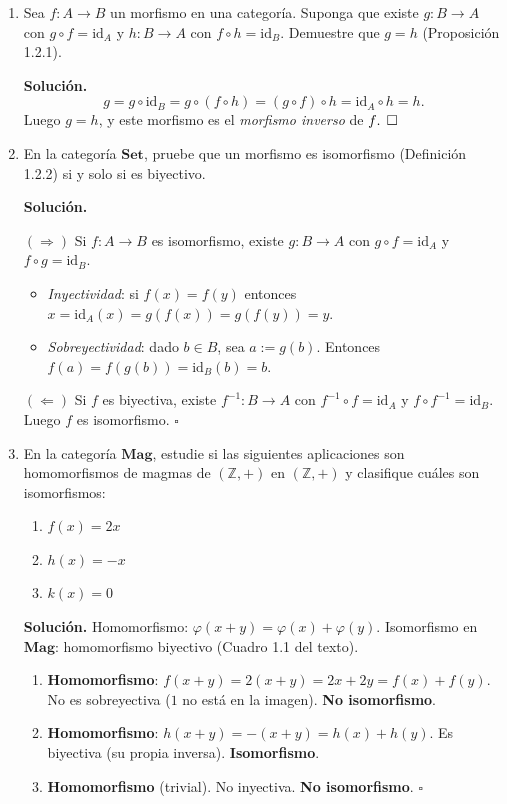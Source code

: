 \begin{enumerate}[label=\textbf{3.\arabic*.}]
\item Sea \(f:A\to B\) un morfismo en una categoría. Suponga que existe
\(g:B\to A\) con \(g\circ f=\mathrm{id}_A\) y \(h:B\to A\) con
\(f\circ h=\mathrm{id}_B\). Demuestre que \(g=h\) (Proposición 1.2.1).

\textbf{Solución.}
\[
    g = g\circ\mathrm{id}_B = g\circ(f\circ h) = (g\circ f)\circ h
      = \mathrm{id}_A\circ h = h.
\]
Luego \(g=h\), y este morfismo es el \textit{morfismo inverso} de \(f$.
\hfill\(\square\)

\item En la categoría \(\mathbf{Set}\), pruebe que un morfismo es isomorfismo
(Definición 1.2.2) si y solo si es biyectivo.

\textbf{Solución.}

\((\Rightarrow)\) Si \(f:A\to B\) es isomorfismo, existe \(g:B\to A\) con
\(g\circ f=\mathrm{id}_A\) y \(f\circ g=\mathrm{id}_B\).
\begin{itemize}
    \item \textit{Inyectividad}: si \(f(x)=f(y)\) entonces
    \(x = \mathrm{id}_A(x)=g(f(x))=g(f(y))=y\).
    \item \textit{Sobreyectividad}: dado \(b\in B\), sea \(a:=g(b)\).
    Entonces \(f(a)=f(g(b))=\mathrm{id}_B(b)=b\).
\end{itemize}

\((\Leftarrow)\) Si \(f\) es biyectiva, existe \(f^{-1}:B\to A\) con
\(f^{-1}\circ f=\mathrm{id}_A\) y \(f\circ f^{-1}=\mathrm{id}_B\).
Luego \(f\) es isomorfismo. \hfill\(\square\)

\item En la categoría \(\mathbf{Mag}\), estudie si las siguientes aplicaciones
son homomorfismos de magmas de \((\mathbb{Z},+)\) en \((\mathbb{Z},+)\)
y clasifique cuáles son isomorfismos:
\begin{enumerate}[label=\alph*)]
    \item \(f(x)=2x\)
    \item \(h(x)=-x\)
    \item \(k(x)=0\)
\end{enumerate}

\textbf{Solución.}
Homomorfismo: \(\varphi(x+y)=\varphi(x)+\varphi(y)\).
Isomorfismo en \(\mathbf{Mag}\): homomorfismo biyectivo (Cuadro 1.1 del texto).
\begin{enumerate}[label=\alph*)]
    \item \textbf{Homomorfismo}: \(f(x+y)=2(x+y)=2x+2y=f(x)+f(y)\).
    No es sobreyectiva (\(1\) no está en la imagen). \textbf{No isomorfismo}.
    \item \textbf{Homomorfismo}: \(h(x+y)=-(x+y)=h(x)+h(y)\).
    Es biyectiva (su propia inversa). \textbf{Isomorfismo}.
    \item \textbf{Homomorfismo} (trivial). No inyectiva. \textbf{No isomorfismo}.
    \hfill\(\square\)
\end{enumerate}


\end{enumerate}

